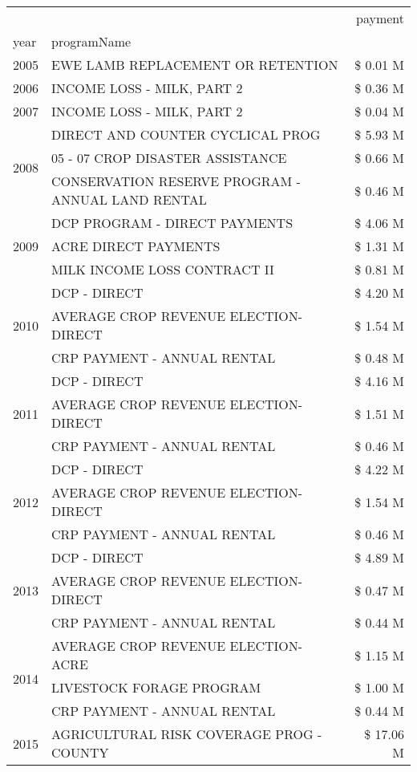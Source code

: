 \begin{tabular}{llr}
\toprule
 &  & payment \\
year & programName &  \\
\midrule
2005 & EWE LAMB REPLACEMENT OR RETENTION & \$ 0.01 M \\
\cline{1-3}
2006 & INCOME LOSS - MILK, PART 2 & \$ 0.36 M \\
\cline{1-3}
2007 & INCOME LOSS - MILK, PART 2 & \$ 0.04 M \\
\cline{1-3}
\multirow[t]{3}{*}{2008} & DIRECT AND COUNTER CYCLICAL PROG & \$ 5.93 M \\
 & 05 - 07 CROP DISASTER ASSISTANCE & \$ 0.66 M \\
 & CONSERVATION RESERVE PROGRAM - ANNUAL LAND RENTAL & \$ 0.46 M \\
\cline{1-3}
\multirow[t]{3}{*}{2009} & DCP PROGRAM - DIRECT PAYMENTS & \$ 4.06 M \\
 & ACRE DIRECT PAYMENTS & \$ 1.31 M \\
 & MILK INCOME LOSS CONTRACT II & \$ 0.81 M \\
\cline{1-3}
\multirow[t]{3}{*}{2010} & DCP - DIRECT & \$ 4.20 M \\
 & AVERAGE CROP REVENUE ELECTION-DIRECT & \$ 1.54 M \\
 & CRP PAYMENT - ANNUAL RENTAL & \$ 0.48 M \\
\cline{1-3}
\multirow[t]{3}{*}{2011} & DCP - DIRECT & \$ 4.16 M \\
 & AVERAGE CROP REVENUE ELECTION-DIRECT & \$ 1.51 M \\
 & CRP PAYMENT - ANNUAL RENTAL & \$ 0.46 M \\
\cline{1-3}
\multirow[t]{3}{*}{2012} & DCP - DIRECT & \$ 4.22 M \\
 & AVERAGE CROP REVENUE ELECTION-DIRECT & \$ 1.54 M \\
 & CRP PAYMENT - ANNUAL RENTAL & \$ 0.46 M \\
\cline{1-3}
\multirow[t]{3}{*}{2013} & DCP - DIRECT & \$ 4.89 M \\
 & AVERAGE CROP REVENUE ELECTION-DIRECT & \$ 0.47 M \\
 & CRP PAYMENT - ANNUAL RENTAL & \$ 0.44 M \\
\cline{1-3}
\multirow[t]{3}{*}{2014} & AVERAGE CROP REVENUE ELECTION-ACRE & \$ 1.15 M \\
 & LIVESTOCK FORAGE PROGRAM & \$ 1.00 M \\
 & CRP PAYMENT - ANNUAL RENTAL & \$ 0.44 M \\
\cline{1-3}
\multirow[t]{3}{*}{2015} & AGRICULTURAL RISK COVERAGE PROG - COUNTY & \$ 17.06 M \\

\end{tabular}
